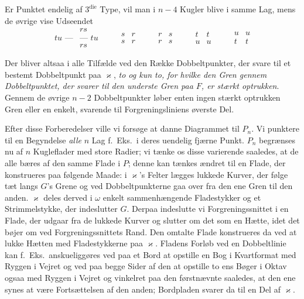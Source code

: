 \documentclass{article}
\begin{document}
Er Punktet endelig af $3^{\text{die}}$ Type, vil man i $n-4$ Kugler blive i samme Lag, mens de øvrige vise Udseendet
\[
\begin{array}{c|c}
& rs \\
tu\text{ ---} & \text{--- } tu \\
& rs
\end{array}
\qquad
\begin{array}{c||c}
s & r \\
\hline
s & r
\end{array}
\qquad
\begin{array}{c||c}
r & s \\
\hline
r & s
\end{array}
\qquad
\begin{array}{c|c}
t & t \\
\hline\hline
u & u
\end{array}
\qquad
\begin{array}{c|c}
u & u \\
\hline\hline
t & t
\end{array}
\]

Der bliver altsaa i alle Tilfælde ved den Række Dobbeltpunkter, der svare til et bestemt Dobbeltpunkt paa $\varkappa$, \emph{to og kun to, for hvilke den Gren gennem Dobbeltpunktet, der svarer til den underste Gren paa $F$, er stærkt optrukken}. Gennem de øvrige $n - 2$ Dobbeltpunkter løber enten ingen stærkt optrukken Gren eller en enkelt, svarende til Forgreningsliniens øverste Del.

Efter disse Forberedelser ville vi forsøge at danne Diagrammet til $P_n$. Vi punktere til en Begyndelse \emph{alle} $n$ Lag f.\ Eks.\ i deres uendelig fjærne Punkt. $P_n$ begrænses nu af $n$ Kugleflader med store Radier; vi tænke os disse varierende saaledes, at de alle bæres af den samme Flade i $P$; denne kan tænkes ændret til en Flade, der konstrueres paa følgende Maade: i $\varkappa$'s Felter lægges lukkede Kurver, der følge tæt langs $G$'s Grene og ved Dobbeltpunkterne gaa over fra den ene Gren til den anden. $\varkappa$ deles derved i $\omega$ enkelt sammenhængende Fladestykker og et Strimmelstykke, der indeslutter $G$. Derpaa indeslutte vi Forgreningssnittet i en Flade, der udgaar fra de lukkede Kurver og slutter om det som en Hætte, idet det bøjer om ved Forgreningssnittets Rand. Den omtalte Flade konstrueres da ved at lukke Hætten med Fladestykkerne paa $\varkappa$. Fladens Forløb ved en Dobbeltlinie kan f.\ Eks.\ anskueliggøres ved paa et Bord at opstille en Bog i Kvartformat med Ryggen i Vejret og ved paa begge Sider af den at opstille to ens Bøger i Oktav ogsaa med Ryggen i Vejret og vinkelret paa den førstnævnte saaledes, at den ene synes at være Fortsættelsen af den anden; Bordpladen svarer da til en Del af $\varkappa$.
\end{document}
